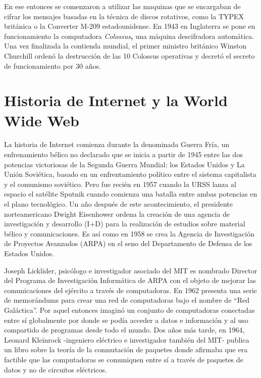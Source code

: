 \documentclass[
  letterpaper,
  DIV=11,
  numbers=noendperiod]{scrreprt}
\begin{document}
En ese entonces se comenzaron a utilizar las maquinas que se encargaban
de cifrar los mensajes basadas en la técnica de discos rotativos, como
la TYPEX británica o la Converter M-209 estadounidense. En 1943 en
Inglaterra se pone en funcionamiento la computadora
\emph{Colossus}\textbf{,} una máquina descifradora automática. Una vez
finalizada la contienda mundial, el primer ministro británico Winston
Churchill ordenó la destrucción de las 10 Colossus operativas y decretó
el secreto de funcionamiento por 30 años.

\section{\texorpdfstring{\textbf{Historia de Internet y la World Wide
Web}}{Historia de Internet y la World Wide Web}}\label{historia-de-internet-y-la-world-wide-web}

La historia de Internet comienza durante la denominada Guerra Fría, un
enfrenamiento bélico no declarado que se inicia a partir de 1945 entre
las dos potencias victoriosas de la Segunda Guerra Mundial: los Estados
Unidos y La Unión Soviética, basado en un enfrentamiento político entre
el sistema capitalista y el comunismo soviético. Pero fue recién en 1957
cuando la URSS lanza al espacio el satélite Sputnik cuando comienza una
batalla entre ambas potencias en el plano tecnológico. Un año después de
este acontecimiento, el presidente norteamericano Dwight Eisenhower
ordena la creación de una agencia de investigación y desarrollo (I+D)
para la realización de estudios sobre material bélico y comunicaciones.
Es así como en 1958 se crea la Agencia de Investigación de Proyectos
Avanzados (ARPA) en el seno del Departamento de Defensa de los Estados
Unidos.

Joseph Licklider, psicólogo e investigador asociado del MIT es nombrado
Director del Programa de Investigación Informática de ARPA con el objeto
de mejorar las comunicaciones del ejército a través de computadoras. En
1962 presenta una serie de memorándums para crear una red de
computadoras bajo el nombre de ``Red Galáctica''. Por aquel entonces
imaginó un conjunto de computadoras conectadas entre sí globalmente por
donde se podía acceder a datos e información y al uso compartido de
programas desde todo el mundo. Dos años más tarde, en 1964, Leonard
Kleinrock -ingeniero eléctrico e investigador también del MIT- publica
un libro sobre la teoría de la conmutación de paquetes donde afirmaba
que era factible que las computadoras se comuniquen entre sí a través de
paquetes de datos y no de circuitos eléctricos.
\end{document}
